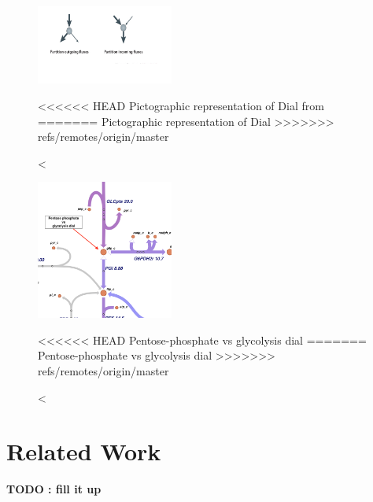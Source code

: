 \documentclass[12pt,chapterheads]{ucsd}
\begin{document}
\begin{figure}[h] 
\centering
\includegraphics[width=0.4\textwidth]{dial_1}
\caption[Pictographic representation of Dial]
<<<<<<< HEAD
{Pictographic representation of Dial from \cite{Chubukov2014}}
=======
{Pictographic representation of Dial}
>>>>>>> refs/remotes/origin/master
\label{fig:dial_1}
\end{figure}

\begin{figure}[h] 
\centering
\includegraphics[width=0.4\textwidth]{dial_2}
\caption[Pentose-phosphate vs glycolysis dial]
<<<<<<< HEAD
{Pentose-phosphate vs glycolysis dial }
=======
{Pentose-phosphate vs glycolysis dial}
>>>>>>> refs/remotes/origin/master
\label{fig:dial_2}
\end{figure}

\chapter{Related Work}
\textbf{TODO : fill it up}\\
\end{document}
